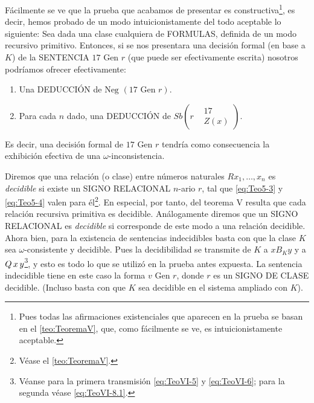 Fácilmente se ve que la prueba que acabamos de presentar es constructiva\footnote{Pues todas las afirmaciones existenciales que aparecen en la prueba se
basan en el \autoref{teo:TeoremaV}, que, como fácilmente se ve, es intuicionistamente aceptable.}, es decir, hemos probado de un modo intuicionistamente 
del todo aceptable lo siguiente: Sea dada una clase cualquiera de FORMULAS, definida de un modo recursivo primitivo. Entonces, si se nos presentara una 
decisión formal (en base a $K$) de la SENTENCIA $17 \text{ Gen } r$ (que puede ser efectivamente escrita) nosotros podríamos ofrecer efectivamente:

\begin{enumerate}
    \item Una DEDUCCIÓN de $\text{Neg }(17 \text{ Gen } r)$.
    \item Para cada $n$ dado, una DEDUCCIÓN de $Sb\left(r
            \begin{aligned}
                &17 \\
                &Z(x)
            \end{aligned}
            \right)$.
\end{enumerate}
Es decir, una decisión formal de $17 \text{ Gen } r$ tendría como consecuencia la exhibición efectiva de una $\omega$-inconsistencia.

Diremos que una relación (o clase) entre números naturales $Rx_1, \dots, x_n$ es \textit{decidible} si existe un SIGNO RELACIONAL $n$-ario $r$, tal que 
\eqref{eq:Teo5-3} y \eqref{eq:Teo5-4} valen para él\footnote{Véase el \autoref{teo:TeoremaV}.}. En especial, por tanto, del teorema V resulta que cada 
relación recursiva primitiva es decidible. Análogamente diremos que un SIGNO RELACIONAL es \textit{decidible} si corresponde de este modo a una relación decidible. 
Ahora bien, para la existencia de sentencias indecidibles basta con que la clase $K$ sea $\omega$-consistente y decidible. Pues la decidibilidad se transmite de
$K$ a $xB_K y$ y a $Q\thinspace x \thinspace y$\footnote{Véanse para la primera transmisión \eqref{eq:TeoVI-5} y \eqref{eq:TeoVI-6}; para la segunda véase 
\eqref{eq:TeoVI-8.1}.}, y esto es todo lo que se utilizó en la prueba antes expuesta. La sentencia indecidible tiene en este caso la forma $v \text{ Gen } r$, 
donde $r$ es un SIGNO DE CLASE decidible. (Incluso basta con que $K$ sea decidible en el sistema ampliado con $K$).

